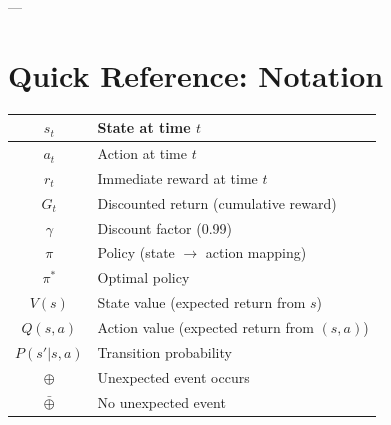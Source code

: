 \documentclass[12pt,a4paper]{article}
\begin{document}
---

\appendix

\section{Quick Reference: Notation}

\begin{tabular}{|c|l|}
\hline
$s_t$ & State at time $t$ \\
\hline
$a_t$ & Action at time $t$ \\
\hline
$r_t$ & Immediate reward at time $t$ \\
\hline
$G_t$ & Discounted return (cumulative reward) \\
\hline
$\gamma$ & Discount factor (0.99) \\
\hline
$\pi$ & Policy (state $\to$ action mapping) \\
\hline
$\pi^*$ & Optimal policy \\
\hline
$V(s)$ & State value (expected return from $s$) \\
\hline
$Q(s,a)$ & Action value (expected return from $(s,a)$) \\
\hline
$P(s'|s,a)$ & Transition probability \\
\hline
$\oplus$ & Unexpected event occurs \\
\hline
$\bar{\oplus}$ & No unexpected event \\
\hline
\end{tabular}
\end{document}
